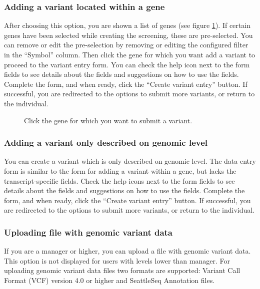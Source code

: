\subsubsection{Adding a variant located within a gene}
After choosing this option, you are shown a list of genes (see figure \ref{fig:select_gene_for_variant_submission}).
If certain genes have been selected while creating the screening, these are pre-selected.
You can remove or edit the pre-selection by removing or editing the configured filter in the ``Symbol'' column.
Then click the gene for which you want add a variant to proceed to the variant entry form.
You can check the help icon next to the form fields to see details
 about the fields and suggestions on how to use the fields.
Complete the form, and when ready, click the ``Create variant entry'' button.
If successful, you are redirected to the options to submit more variants, or return to the individual.

\begin{figure}[ht]
  \begin{shaded}
  \caption{%
    Click the gene for which you want to submit a variant.}
    \label{fig:select_gene_for_variant_submission}
  \end{shaded}
\end{figure}

\subsubsection{Adding a variant only described on genomic level}
You can create a variant which is only described on genomic level.
The data entry form is similar to the form for adding a variant within a gene, but lacks the transcript-specific fields.
Check the help icons next to the form fields to see details
 about the fields and suggestions on how to use the fields.
Complete the form, and when ready, click the ``Create variant entry'' button.
If successful, you are redirected to the options to submit more variants, or return to the individual.

\subsubsection{Uploading file with genomic variant data}
If you are a manager or higher, you can upload a file with genomic variant data.
This option is not displayed for users with levels lower than manager.
For uploading genomic variant data files two formats are supported:
 Variant Call Format (VCF) version 4.0 or higher and SeattleSeq Annotation files.



